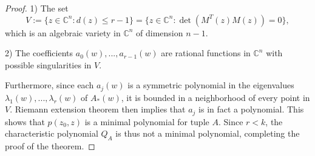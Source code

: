 \documentclass[10pt,a4paper]{amsart}
\newcommand{\C}{{\mathbb C}}
\begin{document}
\begin{proof}
\vspace{1mm}

1) The set \[V:=\{z\in \C^n: d(z)\leq r-1\}=\{z\in \C^n: \det \left(M^T(z)M(z)\right)=0\},\] which is an algebraic variety in $\C^n$ of dimension $n-1$.

2) The coefficients $a_0(w), ..., a_{r-1}(w)$ are rational functions in $\C^n$ with possible singularities in $V$.

\vspace{1mm}

Furthermore, since each $a_j(w)$ is a symmetric polynomial in the eigenvalues $\lambda_1(w), ..., \lambda_r(w)$ of $A_*(w)$, it is bounded in a neighborhood of every point in $V$. Riemann extension theorem then implies that $a_j$ is in fact a polynomial. This shows that $p(z_0,z)$ is a minimal polynomial for tuple $A$. Since $r<k$, the characteristic polynomial $Q_A$ is thus not a minimal polynomial, completing the proof of the theorem.

\end{proof}
\end{document}
